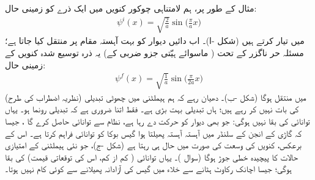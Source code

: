  مثال کے طور پر،  ہم لامتناہی چوکور کنویں میں ایک ذرے   کو زمینی حال:
\begin{align}
\psi^i (x) = \sqrt{\frac{2}{a}} \sin \big ( \frac{\pi}{a} x \big )
\end{align}
 میں تیار کرتے ہیں (شکل -ا)۔  اب دائیں  دیوار کو بہت آہستہ  مقام  پر منتقل کیا جاتا ہے؛  مسئلہ حر ناگزر کے تحت ( ماسوائے ہیّتی  جزو ضربی  کے)  یہ ذرہ توسیع شدہ کنویں کے زمینی حال:
\begin{align}
\psi^f (x) = \sqrt{\frac{1}{a}} \sin \big ( \frac{\pi}{2a} x \big )
\end{align}
 میں منتقل ہوگا  (شکل  -ب)۔ دھیان رہے کہ  ہم ہیملٹنی میں   چھوٹی تبدیلی     (نظریہ اضطراب کی طرح)  کی بات نہیں کر رہے ہیں؛ ہاں تبدیلی بہت بڑی ہے۔  فقط اتنا ضروری  ہے کہ تبدیلی    رونما ہو۔ یہاں توانائی کی بقا نہیں ہوگی: جو بھی دیوار کو حرکت دے رہا ہے،  نظام سے توانائی حاصل کرے گا ، جیسا  کہ  گاڑی کے  انجن کے سلنڈر   میں آہستہ آہستہ پھیلتا ہوا گیس بوکا کو توانائی فراہم کرتا ہے۔ اس کے برعکس،  کنویں کی  وسعت کی صورت میں   حال  ہی رہتا ہے  (شکل  -ج)،    جو نئی  ہیملٹنی کے امتیازی حالات کا  پیچیدہ خطی جوڑ ہوگا  (سوال )۔ یہاں توانائی  ( کم  از کم،  اس کی توقعاتی قیمت) کی   بقا ہوگی؛  جیسا اچانک رکاوٹ ہٹانے سے خلاء میں گیس کی آزادانہ پھیلانے  سے کوئی کام نہیں ہوتا۔


